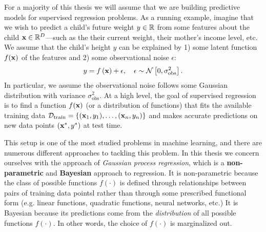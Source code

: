 For a majority of this thesis we will assume that we are building predictive models for supervised regression problems.
As a running example, imagine that we wish to predict a child's future weight $y \in \mathbb{R}$ from some features about the child $\mathbf{x} \in \mathbb{R}^{D}$---such as the their current weight, their mother's income level, etc.
We assume that the child's height $y$ can be explained by 1) some latent function $f(\mathbf{x})$ of the features and 2) some observational noise $\epsilon$:
%
\begin{equation}
  y = f \left( \mathbf{x} \right) + \epsilon, \quad \epsilon \sim \mathcal{N} \left[ 0, \sigma_\text{obs}^2 \right].
  \label{eqn:regression}
\end{equation}
%
In particular, we assume the observational noise follows some Gaussian distribution with variance $\sigma_\text{obs}^2$.
At a high level, the goal of supervised regression is to find a function $f(\mathbf{x})$ (or a distribution of functions) that fits the available training data $\mathcal D_\text{train} = \{(\mathbf{x}_1, y_1), \ldots, (\mathbf{x}_n, y_n)\}$ and makes accurate predictions on new data points $( \mathbf{x}^*, y^* )$ at test time.

This setup is one of the most studied problems in machine learning, and there are numerous different approaches to tackling this problem.
In this thesis we concern ourselves with the approach of \emph{Gaussian process regression}, which is a {\bf non-parametric} and {\bf Bayesian} approach to regression.
It is non-parametric because the class of possible functions $f(\cdot)$ is defined through relationships between pairs of training data pointsl
rather than through some prescribed functional form (e.g. linear functions, quadratic functions, neural networks, etc.)
It is Bayesian because its predictions come from the \emph{distribution} of all possible functions $f(\cdot)$.
In other words, the choice of $f(\cdot)$ is marginalized out.
